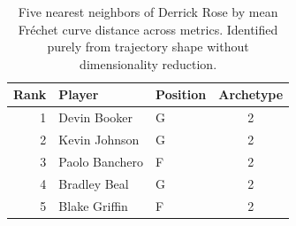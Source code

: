\begin{table}[htbp]
  \centering\small
  \begin{tabular}{rllc}
    \toprule
    Rank & Player & Position & Archetype \\
    \midrule
    1 & Devin Booker & G & 2 \\
    2 & Kevin Johnson & G & 2 \\
    3 & Paolo Banchero & F & 2 \\
    4 & Bradley Beal & G & 2 \\
    5 & Blake Griffin & F & 2 \\
    \bottomrule
  \end{tabular}
  \caption{Five nearest neighbors of Derrick Rose by mean Fr\'{e}chet curve distance across metrics. Identified purely from trajectory shape without dimensionality reduction.}
  \label{tab:Derrick_Rose_frechet_curve_neighbors}
\end{table}

